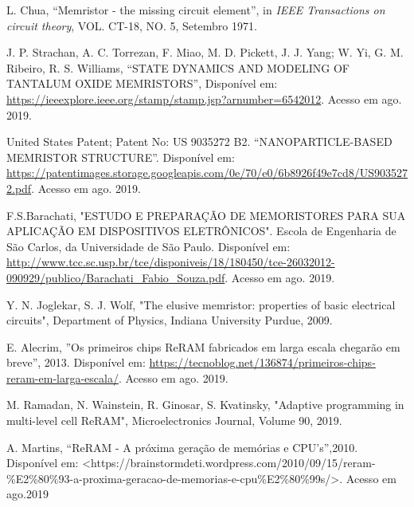 \documentclass{ceel}
\begin{document}
\begin{multicols}{2}
\begin{thebibliography}{9}
    L. Chua,
    “Memristor - the missing circuit element”, 
    in \emph{IEEE Transactions on circuit theory}, VOL. CT-18, NO. 5, Setembro 1971.
    

    J. P. Strachan, A. C. Torrezan, F. Miao, M. D. Pickett, J. J. Yang; W. Yi, G. M. Ribeiro, R. S. Williams, “STATE DYNAMICS AND MODELING OF TANTALUM OXIDE MEMRISTORS”, Disponível em: \url{https://ieeexplore.ieee.org/stamp/stamp.jsp?arnumber=6542012}. Acesso em ago. 2019.
    
    United States Patent; Patent No: US 9035272 B2. “NANOPARTICLE-BASED MEMRISTOR STRUCTURE”. Disponível em: \url{https://patentimages.storage.googleapis.com/0e/70/e0/6b8926f49e7cd8/US9035272.pdf}. Acesso em ago. 2019.
    
   F.S.Barachati, "ESTUDO E PREPARAÇÃO DE MEMORISTORES PARA SUA APLICAÇÃO EM DISPOSITIVOS ELETRÔNICOS". Escola de Engenharia de São Carlos, da Universidade de São Paulo. Disponível em: \url{http://www.tcc.sc.usp.br/tce/disponiveis/18/180450/tce-26032012-090929/publico/Barachati_Fabio_Souza.pdf}. 
   Acesso em ago. 2019.

    Y. N. Joglekar, S. J. Wolf, "The elusive memristor: properties of basic electrical circuits", Department of Physics, Indiana University Purdue, 2009.


   E. Alecrim, ”Os primeiros chips ReRAM fabricados em larga escala chegarão em breve”, 2013. Disponível em: \url{https://tecnoblog.net/136874/primeiros-chips-reram-em-larga-escala/}. Acesso em ago. 2019.
   
    M. Ramadan, N. Wainstein, R. Ginosar, S. Kvatinsky, "Adaptive programming in multi-level cell ReRAM", Microelectronics Journal, Volume 90, 2019. %
    
A. Martins, “ReRAM - A próxima geração de memórias e CPU’s”,2010. Disponível em: <https://brainstormdeti.wordpress.com/2010/09/15/reram-\%E2\%80\%93-a-proxima-geracao-de-memorias-e-cpu\%E2\%80\%99s/>. Acesso em ago.2019



\end{thebibliography}



\end{multicols}
\end{document}
